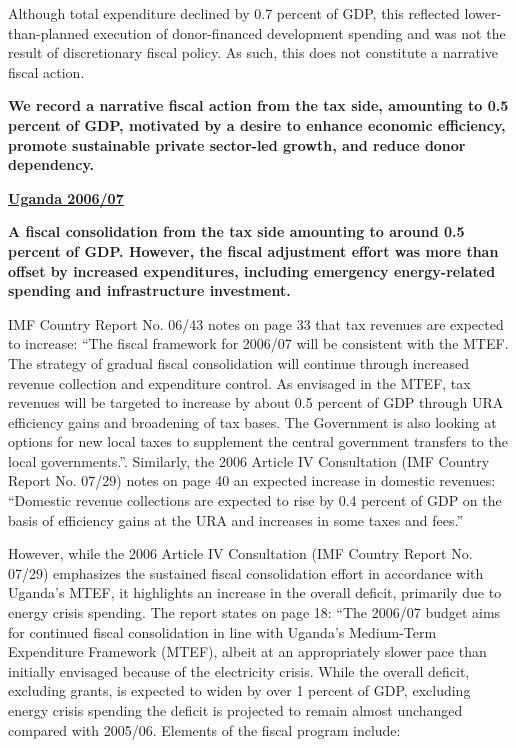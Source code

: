 Although total expenditure declined by 0.7 percent of GDP, this reflected lower-than-planned execution of donor-financed development spending and was not the result of discretionary fiscal policy. As such, this does not constitute a narrative fiscal action.

\textbf{We record a narrative fiscal action from the tax side, amounting to 0.5 percent of GDP, motivated by a desire to enhance economic efficiency, promote sustainable private sector-led growth, and reduce donor dependency.} 

\textbf{\underline{Uganda 2006/07}}

\textbf{A fiscal consolidation from the tax side amounting to around 0.5 percent of GDP. However, the fiscal adjustment effort was more than offset by increased expenditures, including emergency energy-related spending and infrastructure investment.}

IMF Country Report No. 06/43 notes on page 33 that tax revenues are expected to increase: “The fiscal framework for 2006/07 will be consistent with the MTEF. The strategy of gradual fiscal consolidation will continue through increased revenue collection and expenditure control. As envisaged in the MTEF, tax revenues will be targeted to increase by about 0.5 percent of GDP through URA efficiency gains and broadening of tax bases. The Government is also looking at options for new local taxes to supplement the central government transfers to the local governments.”. Similarly, the 2006 Article IV Consultation (IMF Country Report No. 07/29) notes on page 40 an expected increase in domestic revenues: “Domestic revenue collections are expected to rise by 0.4 percent of GDP on the basis of efficiency gains at the URA and increases in some taxes and fees.”

However, while the 2006 Article IV Consultation (IMF Country Report No. 07/29) emphasizes the sustained fiscal consolidation effort in accordance with Uganda’s MTEF, it highlights an increase in the overall deficit, primarily due to energy crisis spending. The report states on page 18: “The 2006/07 budget aims for continued fiscal consolidation in line with Uganda’s Medium-Term Expenditure Framework (MTEF), albeit at an appropriately slower pace than initially envisaged because of the electricity crisis. While the overall deficit, excluding grants, is expected to widen by over 1 percent of GDP, excluding energy crisis spending the deficit is projected to remain almost unchanged compared with 2005/06. Elements of the fiscal program include:

